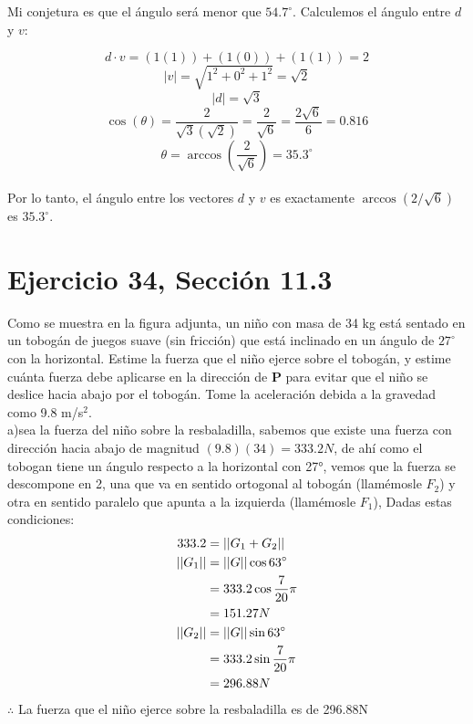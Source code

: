 \documentclass[11pt,letterpaper]{article}
\begin{document}
Mi conjetura es que el ángulo será menor que \( 54.7^\circ \). 
Calculemos el ángulo entre \( d \) y \( v \):

\begin{equation*}
d \cdot v = (1(1)) + (1(0)) + (1(1)) = 2
\end{equation*}
\begin{equation*}
|v| = \sqrt{1^2 + 0^2 + 1^2} = \sqrt{2}
\end{equation*}
\begin{equation*}
|d| = \sqrt{3}
\end{equation*}
\begin{equation*}
\cos(\theta) = \frac{2}{\sqrt{3} (\sqrt{2})} = \frac{2}{\sqrt{6}} = \frac{2\sqrt{6}}{6} = 0.816
\end{equation*}
\begin{equation*}
\theta = \arccos\left(\frac{2}{\sqrt{6}}\right) = 35.3^\circ
\end{equation*}
\\
Por lo tanto, el ángulo entre los vectores \( d \) y \( v \) es exactamente \( \arccos(2/\sqrt{6}) \) es  \( 35.3^\circ \).



\section{Ejercicio 34, Sección 11.3}
Como se muestra en la figura adjunta, un niño con masa de 34 kg está sentado en un tobogán de juegos suave (sin fricción) que está inclinado en un ángulo de $27^\circ$ con la horizontal. Estime la fuerza que el niño ejerce sobre el tobogán, y estime cuánta fuerza debe aplicarse en la dirección de $\mathbf{P}$ para evitar que el niño se deslice hacia abajo por el tobogán. Tome la aceleración debida a la gravedad como 9.8 m/s$^2$.\\


a)sea la fuerza del niño sobre la resbaladilla, sabemos que existe una fuerza con dirección hacia abajo de magnitud $(9.8)(34)=333.2N$, de ahí como el tobogan tiene un ángulo respecto a la horizontal con 27°, vemos que la fuerza se descompone en 2, una que va en sentido ortogonal al tobogán (llamémosle $F_2$) y otra en sentido paralelo que apunta a la izquierda (llamémosle $F_1$), Dadas estas condiciones:
\begin{equation*}
    \begin{split}
        333.2 &= ||G_1+G_2||\\
        ||G_1||&=||G||\cos{63\degree}\\
        &=333.2\cos{\frac{7}{20}\pi}\\
        &=151.27N\\
        ||G_2||&=||G||\sin{63\degree}\\
        &=333.2\sin{\frac{7}{20}\pi}\\
        &=296.88N
    \end{split}
\end{equation*}
$\therefore$ La fuerza que el niño ejerce sobre la resbaladilla es de 296.88N\\
\end{document}
